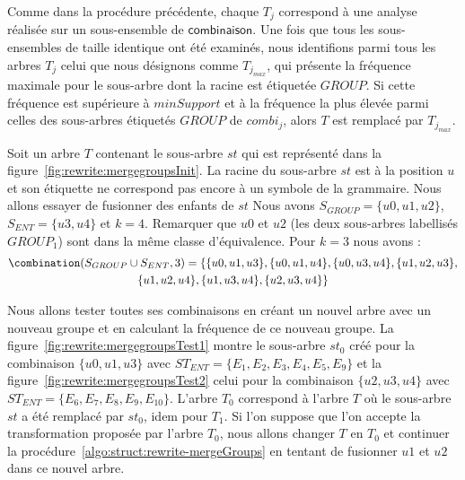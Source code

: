 Comme dans la procédure précédente, chaque $T_j$ correspond à une analyse réalisée sur un sous-ensemble de $\textsf{combinaison}$.
Une fois que tous les sous-ensembles de taille identique ont été examinés, nous identifions parmi tous les arbres $T_j$ celui que nous désignons comme $T_{j_{max}}$, qui présente la fréquence maximale pour le sous-arbre dont la racine est étiquetée $GROUP$.
Si cette fréquence est supérieure à $minSupport$ et à la fréquence la plus élevée parmi celles des sous-arbres étiquetés $GROUP$ de $combi_j$, alors $T$ est remplacé par $T_{j_{max}}$.

\begin{example}
    Soit un arbre $T$ contenant le sous-arbre $st$ qui est représenté dans la figure~\ref{fig:rewrite:mergegroupsInit}.
    La racine du sous-arbre $st$ est à la position $u$ et son étiquette ne correspond pas encore à un symbole de la grammaire.
    Nous allons essayer de fusionner des enfants de $st$
    Nous avons $S_{GROUP}=\{u0, u1, u2\}$, $S_{ENT}=\{u3, u4\}$ et $k=4$.
    Remarquer que $u0$ et $u2$ (les deux sous-arbres labellisés $GROUP_1$) sont dans la même classe d'équivalence.
    Pour $k=3$ nous avons :
    \begin{multline*}
        \combination(S_{GROUP} \cup S_{ENT}, 3) = \{\{u0, u1, u3\},\{u0, u1, u4\}, \{u0, u3, u4\}, \{u1, u2, u3\},\\\{u1, u2, u4\}, \{u1, u3, u4\}, \{u2, u3, u4\} \}
    \end{multline*}
    
    Nous allons tester toutes ses combinaisons en créant un nouvel arbre avec un nouveau groupe et en calculant la fréquence de ce nouveau groupe.
    La figure~\ref{fig:rewrite:mergegroupsTest1} montre le sous-arbre $st_0$ créé pour la combinaison $\{u0, u1, u3\}$ avec $ST_{ENT}=\{E_1, E_2, E_3, E_4, E_5, E_9\}$ et la figure~\ref{fig:rewrite:mergegroupsTest2} celui pour la combinaison $\{u2, u3, u4\}$ avec $ST_{ENT}=\{E_6, E_7, E_8, E_9, E_{10}\}$.
    L'arbre $T_0$ correspond  à l'arbre $T$ où le sous-arbre $st$ a été remplacé par $st_0$, idem pour $T_1$.
    Si l'on suppose que l'on accepte la transformation proposée par l'arbre $T_0$, nous allons changer $T$ en $T_0$ et continuer la procédure~\ref{algo:struct:rewrite-mergeGroups} en tentant de fusionner $u1$ et $u2$ dans ce nouvel arbre.
\end{example}

